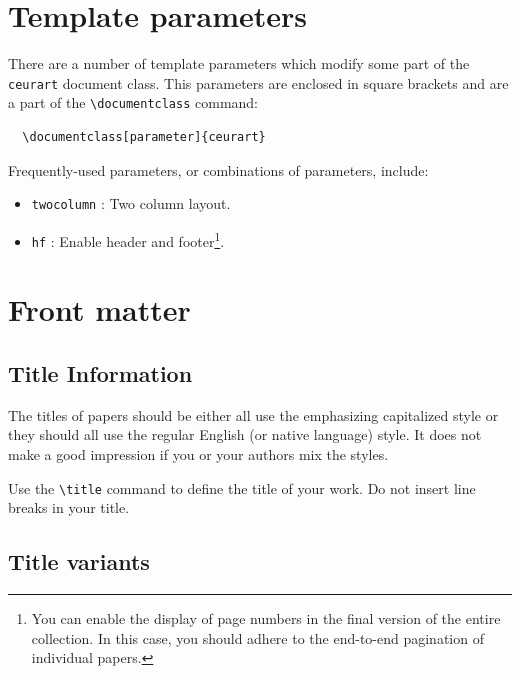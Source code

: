 \documentclass[
]{ceurart}
\begin{document}
\section{Template parameters}

There are a number of template
parameters which modify some part of the \verb|ceurart| document class.
This parameters are enclosed in square
brackets and are a part of the \verb|\documentclass| command:
\begin{lstlisting}
  \documentclass[parameter]{ceurart}
\end{lstlisting}

Frequently-used parameters, or combinations of parameters, include:
\begin{itemize}
\item \verb|twocolumn| : Two column layout.
\item \verb|hf| : Enable header and footer\footnote{You can enable
    the display of page numbers in the final version of the entire
    collection. In this case, you should adhere to the end-to-end
    pagination of individual papers.}.
\end{itemize}

\section{Front matter}

\subsection{Title Information}

The titles of papers should be either all use the emphasizing
capitalized style or they should all use the regular English (or
native language) style. It does not make a good impression if you or
your authors mix the styles.

Use the \verb|\title| command to define the title of your work. Do not
insert line breaks in your title.

\subsection{Title variants}
\end{document}
